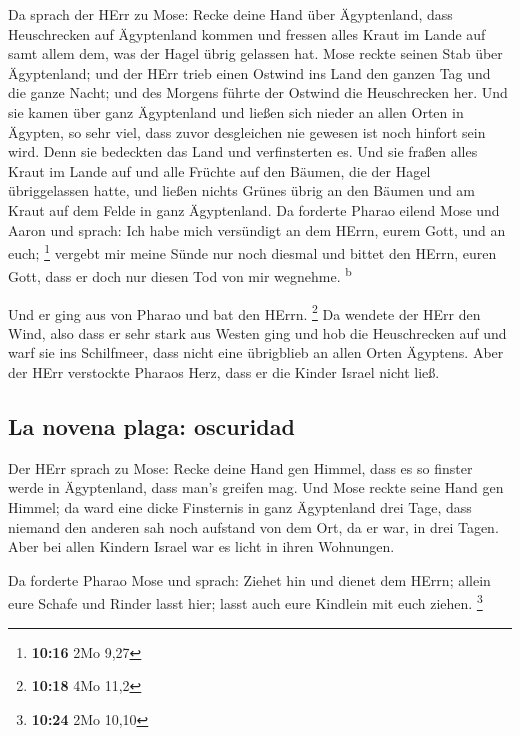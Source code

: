 Da sprach der HErr zu Mose: Recke deine Hand über
Ägyptenland, dass Heuschrecken auf Ägyptenland kommen und fressen alles
Kraut im Lande auf samt allem dem, was der Hagel übrig gelassen hat.
 Mose reckte seinen Stab über Ägyptenland; und der HErr
trieb einen Ostwind ins Land den ganzen Tag und die ganze Nacht; und des
Morgens führte der Ostwind die Heuschrecken her.  Und sie
kamen über ganz Ägyptenland und ließen sich nieder an allen Orten in
Ägypten, so sehr viel, dass zuvor desgleichen nie gewesen ist noch
hinfort sein wird.  Denn sie bedeckten das Land und
verfinsterten es. Und sie fraßen alles Kraut im Lande auf und alle
Früchte auf den Bäumen, die der Hagel übriggelassen hatte, und ließen
nichts Grünes übrig an den Bäumen und am Kraut auf dem Felde in ganz
Ägyptenland.  Da forderte Pharao eilend Mose und Aaron
und sprach: Ich habe mich versündigt an dem HErrn, eurem Gott, und an
euch; \footnote{\textbf{10:16} 2Mo 9,27}  vergebt mir
meine Sünde nur noch diesmal und bittet den HErrn, euren Gott, dass er
doch nur diesen Tod von mir wegnehme. \textsuperscript{b}

 Und er ging aus von Pharao und bat den HErrn.
\footnote{\textbf{10:18} 4Mo 11,2}  Da wendete der HErr
den Wind, also dass er sehr stark aus Westen ging und hob die
Heuschrecken auf und warf sie ins Schilfmeer, dass nicht eine übrigblieb
an allen Orten Ägyptens.  Aber der HErr verstockte
Pharaos Herz, dass er die Kinder Israel nicht ließ.

\hypertarget{la-novena-plaga-oscuridad}{%
\subsection{La novena plaga:
oscuridad}\label{la-novena-plaga-oscuridad}}

 Der HErr sprach zu Mose: Recke deine Hand gen Himmel,
dass es so finster werde in Ägyptenland, dass man's greifen mag.
 Und Mose reckte seine Hand gen Himmel; da ward eine
dicke Finsternis in ganz Ägyptenland drei Tage,  dass
niemand den anderen sah noch aufstand von dem Ort, da er war, in drei
Tagen. Aber bei allen Kindern Israel war es licht in ihren Wohnungen.

 Da forderte Pharao Mose und sprach: Ziehet hin und
dienet dem HErrn; allein eure Schafe und Rinder lasst hier; lasst auch
eure Kindlein mit euch ziehen. \footnote{\textbf{10:24} 2Mo 10,10}

